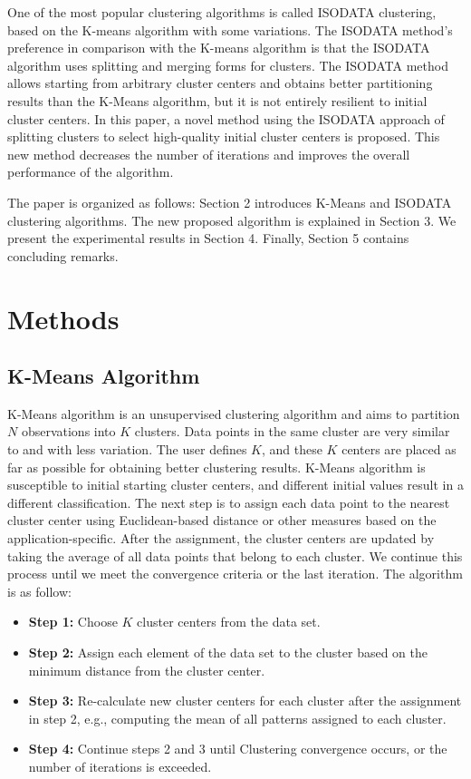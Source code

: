 \documentclass[twoside,twocolumn]{article}
\begin{document}
One of the most popular clustering algorithms is called ISODATA clustering,
based on the K-means algorithm with some variations. The ISODATA method's
preference in comparison with the K-means algorithm is that the ISODATA
algorithm uses splitting and merging forms for clusters. The ISODATA method
allows starting from arbitrary cluster centers and obtains better partitioning
results than the K-Means algorithm, but it is not entirely resilient to initial
cluster centers. In this paper, a novel method using the ISODATA approach of
splitting clusters to select high-quality initial cluster centers is proposed.
This new method decreases the number of iterations and improves the overall
performance of the algorithm.

The paper is organized as follows: Section 2 introduces K-Means and ISODATA
clustering algorithms. The new proposed algorithm is explained in Section 3. We
present the experimental results in Section 4. Finally, Section 5 contains
concluding remarks.


\section{Methods}

\subsection{K-Means Algorithm}

K-Means algorithm is an unsupervised clustering algorithm and aims to partition
$N$ observations into $K$ clusters. Data points in the same cluster are very similar
to and with less variation. The user defines $K$, and these $K$ centers are placed
as far as possible for obtaining better clustering results. K-Means algorithm is
susceptible to initial starting cluster centers, and different initial values
result in a different classification. The next step is to assign each data point
to the nearest cluster center using Euclidean-based distance or other measures
based on the application-specific. After the assignment, the cluster centers are
updated by taking the average of all data points that belong to each cluster. We
continue this process until we meet the convergence criteria or the last
iteration. The algorithm is as follow:

\begin{itemize}
\item \textbf{Step 1:} Choose $K$ cluster centers from the data set.
\item \textbf{Step 2:} Assign each element of the data set to the cluster based
on the minimum distance from the cluster center.
\item \textbf{Step 3:} Re-calculate new cluster centers for each cluster after
the assignment in step 2, e.g., computing the mean of all patterns assigned to
each cluster.
\item \textbf{Step 4:} Continue steps 2 and 3 until Clustering convergence
occurs, or the number of iterations is exceeded.
\end{itemize}
\end{document}
